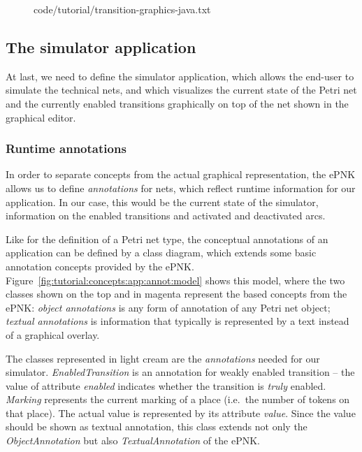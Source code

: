 \begin{figure}[htbp!]
%
  {code/tutorial/transition-graphics-java.txt}
\end{figure}

\subsection{The simulator application}
\label{subsec:tutorial:concepts:app}

At last, we need to define the simulator application, which allows the end-user
to simulate the technical nets, and which visualizes the current state of
the Petri net and the currently enabled transitions graphically on top
of the net shown in the graphical editor.

\subsubsection{Runtime annotations}
\label{subsubsec:tutorial:concepts:app:annot}

In order to separate concepts from the actual graphical representation, the
ePNK allows us to define \emph{annotations} for nets, which reflect runtime
information for our application. In our case, this would be the current state of
the simulator, information on the enabled transitions and activated and deactivated
arcs.

Like for the definition of a Petri net type, the conceptual annotations of
an application can be defined by a class diagram, which extends some basic
annotation concepts provided by the ePNK.
Figure~\ref{fig:tutorial:concepts:app:annot:model} shows this model, where
the two classes shown on the top and in magenta represent the based concepts
from the ePNK: \emph{object annotations} is any form of annotation of any
Petri net object; \emph{textual annotations} is information that typically
is represented by a text instead of a graphical overlay.

The classes represented in light cream are the \emph{annotations} needed for our
simulator.
\emph{EnabledTransition} is an annotation for weakly enabled
transition -- the value of attribute \emph{enabled} indicates whether 
the transition is \emph{truly} enabled. \emph{Marking} represents the
current marking of a  place (i.e.\ the number of tokens on that place). The
actual value is represented by its attribute \emph{value}. Since the value
should be shown as textual annotation, this class extends not only the
\emph{ObjectAnnotation} but also \emph{TextualAnnotation} of the ePNK.

